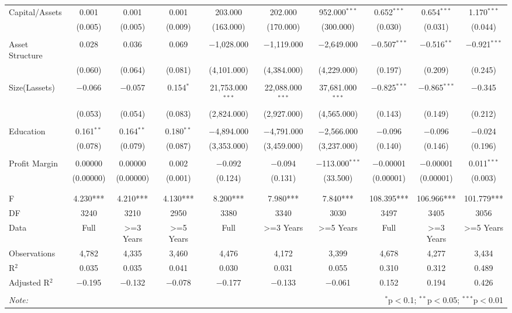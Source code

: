 \documentclass[a4paper, nobind]{templates/ociamthesis}
\begin{document}
\begin{landscape}
\begin{table}[!htbp]
\begin{tabular}{@{\extracolsep{5pt}}lccccccccc}
 Capital/Assets & 0.001 & 0.001 & 0.001 & 203.000 & 202.000 & 952.000$^{***}$ & 0.652$^{***}$ & 0.654$^{***}$ & 1.170$^{***}$ \\ 
  & (0.005) & (0.005) & (0.009) & (163.000) & (170.000) & (300.000) & (0.030) & (0.031) & (0.044) \\ 
  & & & & & & & & & \\ 
 Asset Structure & 0.028 & 0.036 & 0.069 & $-$1,028.000 & $-$1,119.000 & $-$2,649.000 & $-$0.507$^{***}$ & $-$0.516$^{**}$ & $-$0.921$^{***}$ \\ 
  & (0.060) & (0.064) & (0.081) & (4,101.000) & (4,384.000) & (4,229.000) & (0.197) & (0.209) & (0.245) \\ 
  & & & & & & & & & \\ 
 Size(Lassets) & $-$0.066 & $-$0.057 & 0.154$^{*}$ & 21,753.000$^{***}$ & 22,088.000$^{***}$ & 37,681.000$^{***}$ & $-$0.825$^{***}$ & $-$0.865$^{***}$ & $-$0.345 \\ 
  & (0.053) & (0.054) & (0.083) & (2,824.000) & (2,927.000) & (4,565.000) & (0.143) & (0.149) & (0.212) \\ 
  & & & & & & & & & \\ 
 Education & 0.161$^{**}$ & 0.164$^{**}$ & 0.180$^{**}$ & $-$4,894.000 & $-$4,791.000 & $-$2,566.000 & $-$0.096 & $-$0.096 & $-$0.024 \\ 
  & (0.078) & (0.079) & (0.087) & (3,353.000) & (3,459.000) & (3,237.000) & (0.140) & (0.146) & (0.196) \\ 
  & & & & & & & & & \\ 
 Profit Margin & 0.00000 & 0.00000 & 0.002 & $-$0.092 & $-$0.094 & $-$113.000$^{***}$ & $-$0.00001 & $-$0.00001 & 0.011$^{***}$ \\ 
  & (0.00000) & (0.00000) & (0.001) & (0.124) & (0.131) & (33.500) & (0.00001) & (0.00001) & (0.003) \\ 
  & & & & & & & & & \\ 
\hline \\[-1.8ex] 
F & 4.230*** & 4.210*** & 4.130*** & 8.200*** & 7.980*** & 7.840*** & 108.395*** & 106.966*** & 101.779*** \\ 
DF & 3240 & 3210 & 2950 & 3380 & 3340 & 3030 & 3497 & 3405 & 3056 \\ 
Data & Full & >=3 Years & >=5 Years & Full & >=3 Years & >=5 Years & Full & >=3 Years & >=5 Years \\ 
Observations & 4,782 & 4,335 & 3,460 & 4,476 & 4,172 & 3,399 & 4,678 & 4,277 & 3,434 \\ 
R$^{2}$ & 0.035 & 0.035 & 0.041 & 0.030 & 0.031 & 0.055 & 0.310 & 0.312 & 0.489 \\ 
Adjusted R$^{2}$ & $-$0.195 & $-$0.132 & $-$0.078 & $-$0.177 & $-$0.133 & $-$0.061 & 0.152 & 0.194 & 0.426 \\ 
\hline 
\hline \\[-1.8ex] 
\textit{Note:}  & \multicolumn{9}{r}{$^{*}$p$<$0.1; $^{**}$p$<$0.05; $^{***}$p$<$0.01} \\ 
\end{tabular} 
\end{table}

\end{landscape}
\end{document}
